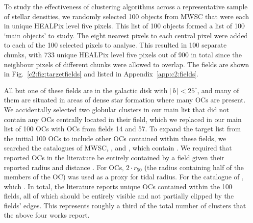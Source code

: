 To study the effectiveness of clustering algorithms across a representative sample of stellar densities, we randomly selected 100 objects from MWSC that were each in unique HEALPix level five pixels. This list of 100 objects formed a list of 100 `main objects' to study. The eight nearest pixels to each central pixel were added to each of the 100 selected pixels to analyse. This resulted in 100 separate chunks, with 733 unique HEALPix level five pixels out of 900 in total since the neighbour pixels of different chunks were allowed to overlap. The fields are shown in Fig.~\ref{c2:fig:targetfields} and listed in Appendix~\ref{app:c2:fields}. \emph{} 

All but one of these fields are in the galactic disk with $|\,b\,|<25^{\circ}$, and many of them are situated in areas of dense star formation where many OCs are present. We accidentally selected two globular clusters in our main list that did not contain any OCs centrally located in their field, which we replaced in our main list of 100 OCs with OCs from fields 14 and 57. To expand the target list from the initial 100 OCs to include other OCs contained within these fields, we searched the catalogues of MWSC, \cite{cantat-gaudin_clusters_2020}, \cite{castro-ginard_hunting_2020} and \cite{liu_catalog_2019}, which contain . We required that reported OCs in the literature be entirely contained by a field given their reported radius and distance . For \cite{cantat-gaudin_clusters_2020} OCs, $2 \cdot r_{50}$ (the radius containing half of the members of the OC) was used as a proxy for tidal radius. For the catalogue of \cite{castro-ginard_hunting_2020}, which . In total, the literature reports unique OCs contained within the 100 fields, all of which should be entirely visible and not partially clipped by the fields' edges. This represents roughly a third of the total number of clusters that the above four works report.

